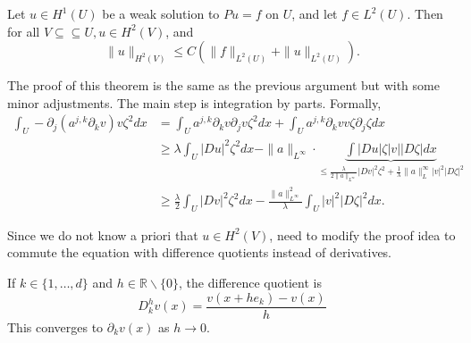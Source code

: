 \begin{theorem}
\label{thm: $H^2$ elliptic regularity}
 Let $u \in H^{1}(U)$ be a weak solution to $P u=f$ on $U$, and let $f \in L^{2}(U)$. Then for all $V \subseteq \subseteq U, u \in H^{2}(V)$, and
$$
\|u\|_{H^{2}(V)} \leq C\left(\|f\|_{L^{2}(U)}+\|u\|_{L^{2}(U)}\right) .
$$
\end{theorem}
The proof of this theorem is the same as the previous argument but with some minor adjustments. The main step is integration by parts. Formally,
$$
\begin{aligned}
\int_{U}-\partial_{j}\left(a^{j, k} \partial_{k} v\right) v \zeta^{2} d x &=\int_{U} a^{j, k} \partial_{k} v \partial_{j} v \zeta^{2} d x+\int_{U} a^{j, k} \partial_{k} v v \zeta \partial_{j} \zeta d x \\
& \geq \lambda \int_{U}|D u|^{2} \zeta^{2} d x-\|a\|_{L^{\infty}} \cdot \underbrace{\int|D u| \zeta|v||D \zeta| d x}_{\leq \frac{\lambda}{2 \|a\|_{L^{\infty}}}|D v|^{2} \zeta^{2}+\frac{1}{\lambda}\|a\|_{L}^{\infty}|v|^{2}|D \zeta|^{2}}\\ 
&\geq \frac{\lambda}{2} \int_{U}|D v|^{2} \zeta^{2} d x-\frac{\|a\|_{L^{\infty}}^{2}}{\lambda} \int_{U}|v|^{2}|D \zeta|^{2} d x.
\end{aligned}
$$

Since we do not know a priori that $u \in H^{2}(V)$, need to modify the proof idea to commute the equation with difference quotients instead of derivatives.

\begin{definition}
\label{def: Difference quotient}
 If $k \in\{1, \ldots, d\}$ and $h \in \mathbb{R} \backslash\{0\}$, the difference quotient is
$$
D_{k}^{h} v(x)=\frac{v(x+h e_k)-v(x)}{h}
$$
This converges to $\partial_{k} v(x)$ as $h \rightarrow 0$.
\end{definition}

